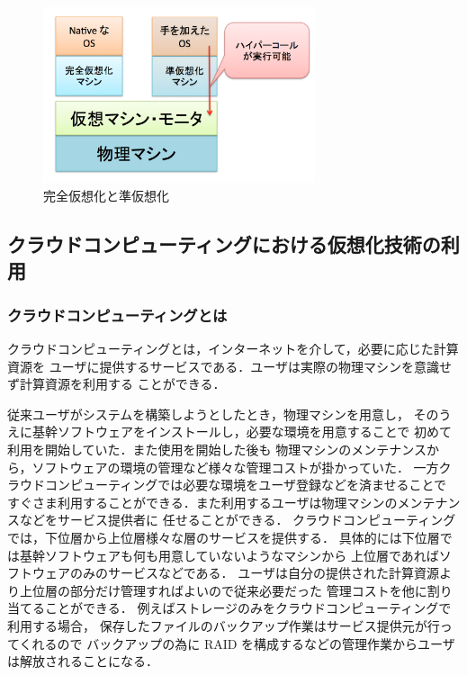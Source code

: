 \documentclass[graduation-thesis]{mlarticle}
\begin{document}
\begin{figure}[H]\begin{center}\includegraphics[width=8.0cm]{./img/full_para.png}\caption{ 完全仮想化と準仮想化}\label{full_para}\end{center}\end{figure}

\subsection{クラウドコンピューティングにおける仮想化技術の利用}
\label{sec-2-2}
\subsubsection{クラウドコンピューティングとは}
\label{sec-2-2-1}
クラウドコンピューティングとは，インターネットを介して，必要に応じた計算資源を
ユーザに提供するサービスである．ユーザは実際の物理マシンを意識せず計算資源を利用する
ことができる．

従来ユーザがシステムを構築しようとしたとき，物理マシンを用意し，
そのうえに基幹ソフトウェアをインストールし，必要な環境を用意することで
初めて利用を開始していた．また使用を開始した後も
物理マシンのメンテナンスから，ソフトウェアの環境の管理など様々な管理コストが掛かっていた．
一方クラウドコンピューティングでは必要な環境をユーザ登録などを済ませることで
すぐさま利用することができる．また利用するユーザは物理マシンのメンテナンスなどをサービス提供者に
任せることができる．
クラウドコンピューティングでは，下位層から上位層様々な層のサービスを提供する．
具体的には下位層では基幹ソフトウェアも何も用意していないようなマシンから
上位層であればソフトウェアのみのサービスなどである．
ユーザは自分の提供された計算資源より上位層の部分だけ管理すればよいので従来必要だった
管理コストを他に割り当てることができる．
例えばストレージのみをクラウドコンピューティングで利用する場合，
保存したファイルのバックアップ作業はサービス提供元が行ってくれるので
バックアップの為に RAID を構成するなどの管理作業からユーザは解放されることになる．
\end{document}
